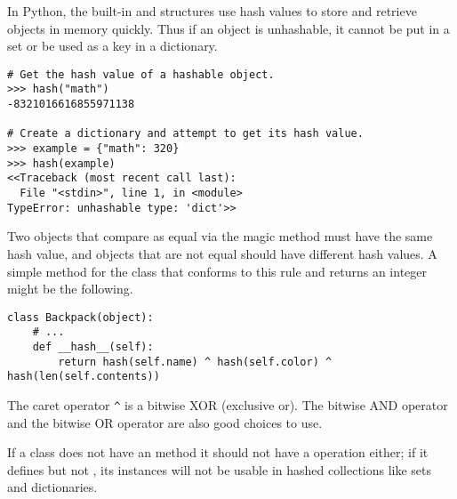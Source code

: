 In Python, the built-in  and  structures use hash values to store and retrieve objects in memory quickly.
Thus if an object is unhashable, it cannot be put in a set or be used as a key in a dictionary.

\begin{lstlisting}
# Get the hash value of a hashable object.
>>> hash("math")
-8321016616855971138

# Create a dictionary and attempt to get its hash value.
>>> example = {"math": 320}
>>> hash(example)
<<Traceback (most recent call last):
  File "<stdin>", line 1, in <module>
TypeError: unhashable type: 'dict'>>
\end{lstlisting}

Two objects that compare as equal via the  magic method must have the same hash value, and objects that are not equal should have different hash values.
A simple  method for the  class that conforms to this rule and returns an integer might be the following.

\begin{lstlisting}
class Backpack(object):
    # ...
    def __hash__(self):
        return hash(self.name) ^ hash(self.color) ^ hash(len(self.contents))
\end{lstlisting}

The caret operator \texttt{\^} is a bitwise XOR (exclusive or).
The bitwise AND operator \li{&} and the bitwise OR operator \li{|} are also good choices to use.

\begin{warn}
If a class does not have an  method it should not have a  operation either; if it defines  but not , its instances will not be usable in hashed collections like sets and dictionaries.
\end{warn}

